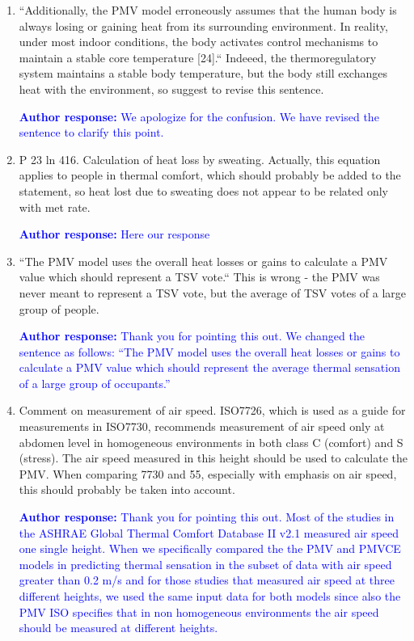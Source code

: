 \documentclass[a4paper, 10pt]{letter}
\newcommand{\response}[1]{\textcolor{blue}{\textbf{Author response:} #1}}
\begin{document}
\begin{letter}
\begin{enumerate}
            \item ``Additionally, the PMV model erroneously assumes that the human body is always losing or gaining heat from its surrounding environment.
            In reality, under most indoor conditions, the body activates control mechanisms to maintain a stable core temperature [24].``
            Indeeed, the thermoregulatory system maintains a stable body temperature, but the body still exchanges heat with the environment, so suggest to revise this sentence.

            \response{
                We apologize for the confusion.
                We have revised the sentence to clarify this point.
            }

            \item P 23 ln 416.
            Calculation of heat loss by sweating.
            Actually, this equation applies to people in thermal comfort, which should probably be added to the statement, so heat lost due to sweating does not appear to be related only with met rate.

            \response{Here our response}

            \item ``The PMV model uses the overall heat losses or gains to calculate a PMV value which should represent a TSV vote.`` This is wrong - the PMV was never meant to represent a TSV vote, but the average of TSV votes of a large group of people.

            \response{
                Thank you for pointing this out.
                We changed the sentence as follows: ``The PMV model uses the overall heat losses or gains to calculate a PMV value which should represent the average thermal sensation of a large group of occupants.''
            }

            \item Comment on measurement of air speed.
            ISO7726, which is used as a guide for measurements in ISO7730, recommends measurement of air speed only at abdomen level in homogeneous environments in both class C (comfort) and S (stress).
            The air speed measured in this height should be used to calculate the PMV\@.
            When comparing 7730 and 55, especially with emphasis on air speed, this should probably be taken into account.

            \response{
                Thank you for pointing this out.
                Most of the studies in the ASHRAE Global Thermal Comfort Database II v2.1 measured air speed one single height.
                When we specifically compared the the PMV and PMVCE models in predicting thermal sensation in the subset of data with air speed greater than 0.2 m/s and for those studies that measured air speed at three different heights, we used the same input data for both models since also the PMV ISO specifies that in non homogeneous environments the air speed should be measured at different heights.
            }


\end{enumerate}
\end{letter}
\end{document}
